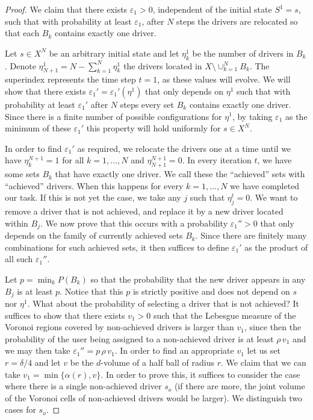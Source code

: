 \documentclass[10pt,a4paper]{amsart}
\begin{document}
\begin{proof}
We claim that there exists $\varepsilon_1>0$, independent of the initial state $S^1=s$, such that with probability at least $\varepsilon_1$, after $N$ steps the drivers are relocated so that each $B_k$ contains exactly one driver.

Let $s\in X^N$ be an arbitrary initial state and let $\eta_k^1$ be the number of drivers in $B_k$. Denote $\eta^1_{N+1}=N-\sum_{k=1}^N\eta_k^1$ the drivers located in $X\setminus\cup_{k=1}^NB_k$. The superindex represents the time step $t=1$, as these values will evolve. We will show that there exists $\varepsilon_1'=\varepsilon_1'(\eta^1)$ that only depends on $\eta^1$ such that with probability at least
$\varepsilon_1'$ after $N$ steps
every set $B_k$ contains exactly one driver.
Since there is a finite number of possible configurations for $\eta^1$, by taking $\varepsilon_1$ as the minimum of these $\varepsilon_1'$ this property will hold uniformly for $s\in X^N$.  

In order to find  $\varepsilon_1'$ as required, we relocate the drivers one at a time  until we have $\eta^{N+1}_k=1$ for all $k=1,\ldots,N$ and $\eta^{N+1}_{N+1}=0$. In every iteration $t$, we have some sets $B_k$ that have exactly one driver. We call these the ``achieved'' sets with ``achieved'' drivers. When this happens for every $k=1,...,N$ we have 
completed our task. If this is not yet the case, we take any $j$ such that $\eta^t_j=0$. We want to remove a driver that is not  achieved, and replace it by a new driver located within $B_j$. We now prove that this occurs with a probability $\varepsilon_1''>0$ that 
only depends on the family of currently achieved sets $B_k$. Since there are finitely many combinations for such achieved sets, it then suffices to define $\varepsilon_1'$ as the product of all such $\varepsilon_1''$. 

Let $p=\min_{k}P(B_k)$ so that the probability that the new driver appears in any $B_j$ is at least $p$. Notice that this $p$ is strictly positive and does not depend on $s$ nor $\eta^1$. What about the probability of selecting a driver that is not achieved? It suffices to show that there exists $v_1>0$ such that the Lebesgue measure of the Voronoi regions covered by non-achieved drivers  is larger than $v_1$, since then the probability of the user being assigned to a non-achieved driver is at least $\rho\,v_1$ and we may then take $\varepsilon_1''=p\,\rho\,v_1$. In order to find an appropriate $v_1$ let us set $r=\delta/4$ and let $v$ be the $d$-volume of a half ball of radius $r$. We claim that we can take $v_1=\min\{\alpha(r),v\}$. In order to prove this, it suffices to 
 consider the case where there is a single non-achieved driver $s_o$ (if there are more, the joint volume of the Voronoi cells of non-achieved drivers would be larger). We distinguish two cases for $s_o$.
 \vspace{-2ex}
 

\end{proof}
\end{document}
